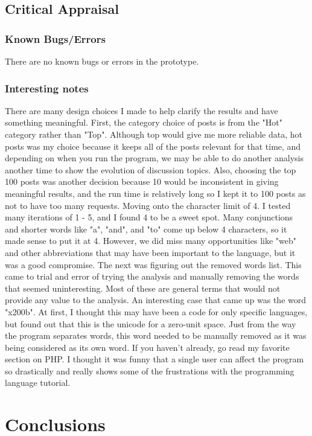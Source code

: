 \documentclass{article}
\theoremstyle{theorem}
\theoremstyle{definition}
\theoremstyle{remark}
\begin{document}
\subsection{Critical Appraisal}
\subsubsection{Known Bugs/Errors}
There are no known bugs or errors in the prototype.

\subsubsection{Interesting notes}
There are many design choices I made to help clarify the results and have something meaningful. First, the category choice of posts is from the "Hot" category rather than "Top". Although top would give me more reliable data, hot posts was my choice because it keeps all of the posts relevant for that time, and depending on when you run the program, we may be able to do another analysis another time to show the evolution of discussion topics. Also, choosing the top 100 posts was another decision because 10 would be inconsistent in giving meaningful results, and the run time is relatively long so I kept it to 100 posts as not to have too many requests. Moving onto the character limit of 4. I tested many iterations of 1 - 5, and I found 4 to be a sweet spot. Many conjunctions and shorter words like "a", "and", and "to" come up below 4 characters, so it made sense to put it at 4. However, we did miss many opportunities like "web" and other abbreviations that may have been important to the language, but it was a good compromise. The next was figuring out the removed words list. This came to trial and error of trying the analysis and manually removing the words that seemed uninteresting. Most of these are general terms that would not provide any value to the analysis. An interesting case that came up was the word "x200b". At first, I thought this may have been a code for only specific languages, but found out that this is the unicode for a zero-unit space. Just from the way the program separates words, this word needed to be manually removed as it was being considered as its own word. If you haven't already, go read my favorite section on PHP. I thought it was funny that a single user can affect the program so drastically and really shows some of the frustrations with the programming language tutorial. 

\section{Conclusions}\label{conclusions}
\end{document}

